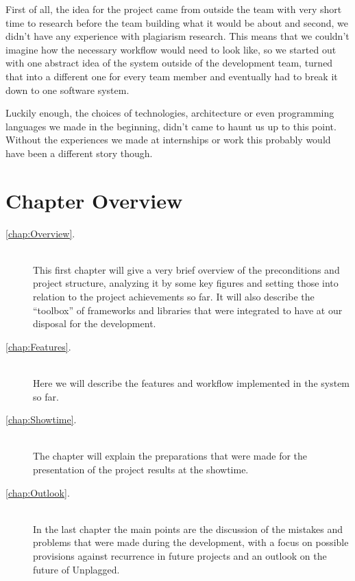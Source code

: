First of all, the idea for the project came from outside the team with very short time to research before the team building what it would be 
about and second, we didn't have any experience with plagiarism research. This means that we couldn't imagine how the necessary workflow would need to look like, so we started out with one abstract idea of the system 
outside of the development team, turned that into a different one for every team member and eventually had to break it down to one software system.

Luckily enough, the choices of technologies, architecture or even programming languages we made in the beginning, didn't came to haunt us up to this point. Without the experiences we made at internships or work this probably would have been a different story though.

\section*{Chapter Overview}

\begin{description}
\item[\ref{chap:Overview}. ] \hfill \\
This first chapter will give a very brief overview of the preconditions and project structure, analyzing it by some key figures and setting those into relation to the project achievements so far. It will also describe the \enquote{toolbox} of
frameworks and libraries that were integrated to have at our disposal for the development.
\item[\ref{chap:Features}. ] \hfill \\
Here we will describe the features and workflow implemented in the system so far.
\item[\ref{chap:Showtime}. ] \hfill \\
The chapter  will explain the preparations that were made for the presentation of the project results at the showtime.
\item[\ref{chap:Outlook}. ] \hfill \\
In the last chapter the main points are the discussion of the mistakes and
problems that were made during the development, with a focus on possible provisions against recurrence in future projects and an
outlook on the future of Unplagged.
\end{description}

